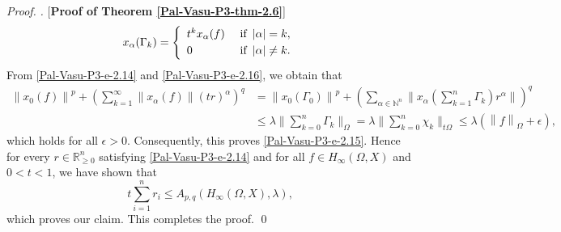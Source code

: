 \documentclass[a4paper,12pt]{amsart}
\theoremstyle{definition}
\newcounter {own}
\newenvironment{pf}[1][]{%
 \vskip 3mm
 \noindent
 \ifthenelse{\equal{#1}{}}%
  {{\slshape Proof. }}%
  {{\slshape #1.} }%
 }%
{\qed\bigskip}
\newcommand{\norm}[1]{\left\lVert#1\right\rVert}
\begin{document}
\begin{pf} [{\bf Proof of Theorem \ref{Pal-Vasu-P3-thm-2.6}}]
\begin{equation*}
		x_{\alpha}(\Gamma_{k})=
		\left\{\begin{array}{ll}
			t^kx_{\alpha}(f) & \mbox{ if  \,$|\alpha|=k$},\\[1mm]
			0  & \mbox{ if \,$|\alpha|\neq k$}.
		\end{array}\right.
	\end{equation*}
	From \eqref{Pal-Vasu-P3-e-2.14} and \eqref{Pal-Vasu-P3-e-2.16}, we obtain that
	\begin{align*}
		\norm{x_0(f)}^p+\left(\sum_{k=1}^{\infty}\norm{x_{\alpha}(f)}(tr)^{\alpha}\right)^q &= \norm{x_0(\Gamma_{0})}^p + \left(\sum_{\alpha\in \mathbb{N}^n}\bigg\|x_{\alpha}\left(\sum_{k=1}^{n}\Gamma_{k}\right)r^{\alpha}\bigg\|\right)^q\\[2mm] & \leq \lambda \bigg\|\sum_{k=0}^{n}\Gamma_{k}\bigg\|_{\Omega}=\lambda \bigg\|\sum_{k=0}^{n}\chi_{k}\bigg\|_{t\Omega}\leq \lambda \left(\norm{f}_{\Omega}+\epsilon\right),
	\end{align*} 
	which holds for all $\epsilon>0$. Consequently, this proves \eqref{Pal-Vasu-P3-e-2.15}.
	Hence for every $r\in \mathbb{R}^n_{\geq 0}$ satisfying \eqref{Pal-Vasu-P3-e-2.14} and for all $f\in H_{\infty}(\Omega, X)$ and $0<t<1$, we have shown that 
	\begin{equation*}
		t\sum_{i=1}^{n}r_i \leq A_{p,q}(H_{\infty}(\Omega,X),\lambda),
	\end{equation*}
	which proves our claim. This completes the proof.
\end{pf}
\vspace{-2mm}
\end{document}
